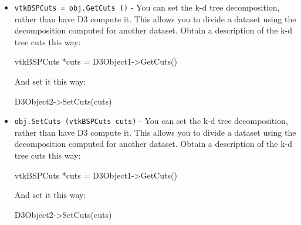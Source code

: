 \begin{itemize}
\item  \verb|vtkBSPCuts = obj.GetCuts ()| -  You can set the k-d tree decomposition, rather than
 have D3 compute it.  This allows you to divide a dataset using
 the decomposition computed for another dataset.  Obtain a description
 of the k-d tree cuts this way:

    vtkBSPCuts *cuts = D3Object1->GetCuts()

 And set it this way:

    D3Object2->SetCuts(cuts) 

\item  \verb|obj.SetCuts (vtkBSPCuts cuts)| -  You can set the k-d tree decomposition, rather than
 have D3 compute it.  This allows you to divide a dataset using
 the decomposition computed for another dataset.  Obtain a description
 of the k-d tree cuts this way:

    vtkBSPCuts *cuts = D3Object1->GetCuts()

 And set it this way:

    D3Object2->SetCuts(cuts) 

\end{itemize}

